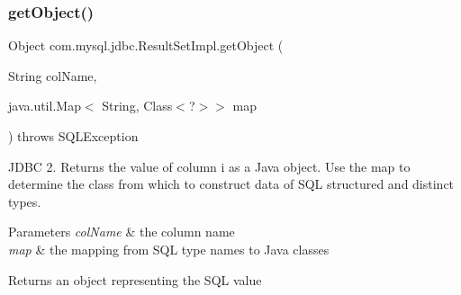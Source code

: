 \subsubsection{\texorpdfstring{get\+Object()}{getObject()}\hspace{0.1cm}{\footnotesize\ttfamily [4/4]}}
{\footnotesize\ttfamily Object com.\+mysql.\+jdbc.\+Result\+Set\+Impl.\+get\+Object (\begin{DoxyParamCaption}\item[{String}]{col\+Name,  }\item[{java.\+util.\+Map$<$ String, Class$<$?$>$$>$}]{map }\end{DoxyParamCaption}) throws S\+Q\+L\+Exception}

J\+D\+BC 2. Returns the value of column i as a Java object. Use the map to determine the class from which to construct data of S\+QL structured and distinct types.


\begin{DoxyParams}{Parameters}
{\em col\+Name} & the column name \\
\hline
{\em map} & the mapping from S\+QL type names to Java classes\\
\hline
\end{DoxyParams}
\begin{DoxyReturn}{Returns}
an object representing the S\+QL value
\end{DoxyReturn}

